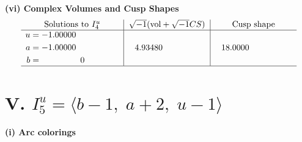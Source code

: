 \documentclass[1p]{elsarticle_modified}
\theoremstyle{definition}
\newcommand{\I}{\sqrt{-1}}
\begin{document}
\newpage\flushleft \textbf{(vi) Complex Volumes and Cusp Shapes}
$$\begin{array}{c|c|c}  
\text{Solutions to }I^u_{4}& \I (\text{vol} + \sqrt{-1}CS) & \text{Cusp shape}\\
 \hline 
\begin{aligned}
u &= -1.00000\phantom{ +0.000000I} \\
a &= -1.00000\phantom{ +0.000000I} \\
b &= \phantom{-0.000000 } 0\end{aligned}
 & \phantom{-}4.93480\phantom{ +0.000000I} & \phantom{-}18.0000\phantom{ +0.000000I}\\
 \hline 
 \end{array}$$\newpage\newpage\renewcommand{\arraystretch}{1}
\centering \section*{V. $I^u_{5}= \langle b-1,\;a+2,\;u-1 \rangle$}
\flushleft \textbf{(i) Arc colorings}\\
\end{document}
